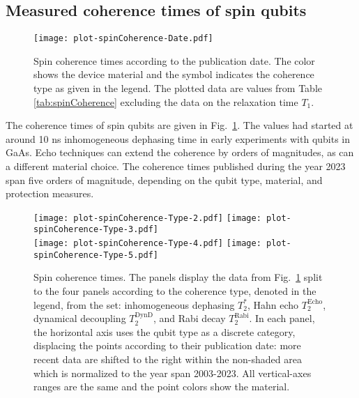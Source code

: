 \documentclass[aps, prx, showpacs, twocolumn, superscriptaddress, notitlepage, longbibliography, floatfix, nofootinbib]{revtex4-2}
\newcommand{\TRabi}{T_2^\mathrm{Rabi}}
\newcommand{\TEcho}{T_2^\mathrm{Echo}}
\newcommand{\TDynD}{T_2^\mathrm{DynD}}
\newcommand{\recheck}[1]{{#1}}
\begin{document}
\subsection{Measured coherence times of spin qubits}

\begin{figure}
  \texttt{[image: plot-spinCoherence-Date.pdf]}
  \caption{
  \label{fig:spinPhaseCoherenceAll}
  Spin coherence times according to the publication date. The color shows the device material and the symbol indicates the coherence type as given in the legend. The plotted data are values from Table \ref{tab:spinCoherence} excluding the data on the relaxation time $T_1$. 
  }
\end{figure}

The coherence times of spin qubits are given in Fig.~\ref{fig:spinPhaseCoherenceAll}. The values had started at around 10 ns inhomogeneous dephasing time in early experiments with qubits in GaAs. Echo techniques can extend the coherence by orders of magnitudes, as can a different material choice. \recheck{The coherence times published during the year 2023 span five orders of magnitude, depending on the qubit type, material, and protection measures.}

\begin{figure}
  \texttt{[image: plot-spinCoherence-Type-2.pdf]}
  \texttt{[image: plot-spinCoherence-Type-3.pdf]}\hfill \\
  \texttt{[image: plot-spinCoherence-Type-4.pdf]} \hfill
  \texttt{[image: plot-spinCoherence-Type-5.pdf]}
  \caption{
  \label{fig:spinPhaseCoherenceSubplots}
  Spin coherence times. The panels display the data from Fig.~\ref{fig:spinPhaseCoherenceAll} split to the four panels according to the coherence type, denoted in the legend, from the set: inhomogeneous dephasing $T_2^*$, Hahn echo $\TEcho$, dynamical decoupling $\TDynD$, and Rabi decay $\TRabi$. In each panel, the horizontal axis uses the qubit type as a discrete category, displacing the points according to their publication date: more recent data are shifted to the right within the non-shaded area which is \recheck{normalized to the year span 2003-2023}. All vertical-axes ranges are the same and the point colors show the material.
  }
\end{figure}
\end{document}
